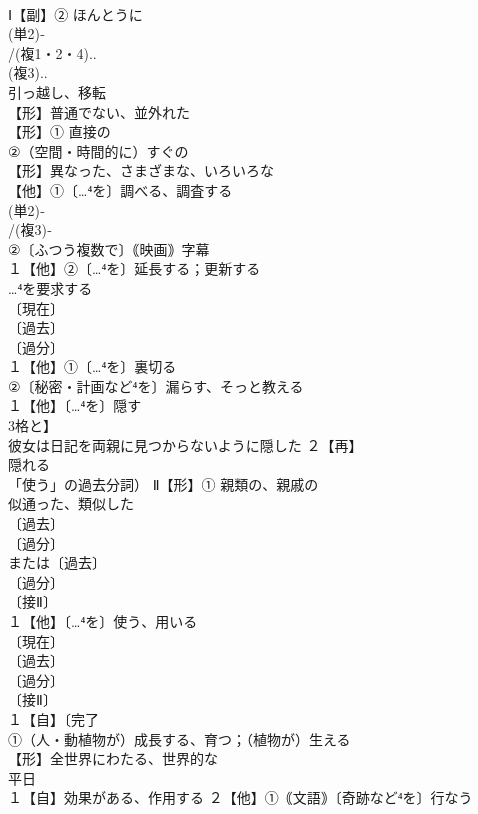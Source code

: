 \documentclass[8pt]{extreport}
\begin{document}
\begin{CJK}{UTF8}{min}
\\	Ⅰ【副】② ほんとうに
\\	(単2)‐
\\	/(複1・2・4)..
\\	(複3)..
\\	引っ越し、移転 
\\	【形】普通でない、並外れた 
\\	【形】① 直接の 
\\	②（空間・時間的に）すぐの
\\	【形】異なった、さまざまな、いろいろな
\\	【他】①〔…⁴を〕調べる、調査する 
\\	(単2)‐
\\	/(複3)‐
\\	②〔ふつう複数で〕｟映画｠字幕
\\	１【他】②〔…⁴を〕延長する；更新する 
\\	…⁴を要求する
\\	〔現在〕
\\	〔過去〕
\\	〔過分〕
\\	１【他】①〔…⁴を〕裏切る 
\\	②〔秘密・計画など⁴を〕漏らす、そっと教える
\\	１【他】〔…⁴を〕隠す 
\\	3格と】
\\	彼女は日記を両親に見つからないように隠した ２【再】
\\	隠れる
\\	「使う」の過去分詞） Ⅱ【形】① 親類の、親戚の　
\\	似通った、類似した 
\\	〔過去〕
\\	〔過分〕
\\	または〔過去〕
\\	〔過分〕
\\	〔接Ⅱ〕
\\	１【他】〔…⁴を〕使う、用いる 
\\	〔現在〕
\\	〔過去〕
\\	〔過分〕
\\	〔接Ⅱ〕
\\	１【自】〔完了
\\	①（人・動植物が）成長する、育つ；（植物が）生える 
\\	【形】全世界にわたる、世界的な
\\	平日
\\	１【自】効果がある、作用する ２【他】①｟文語｠〔奇跡など⁴を〕行なう 

\end{CJK}
\end{document}
